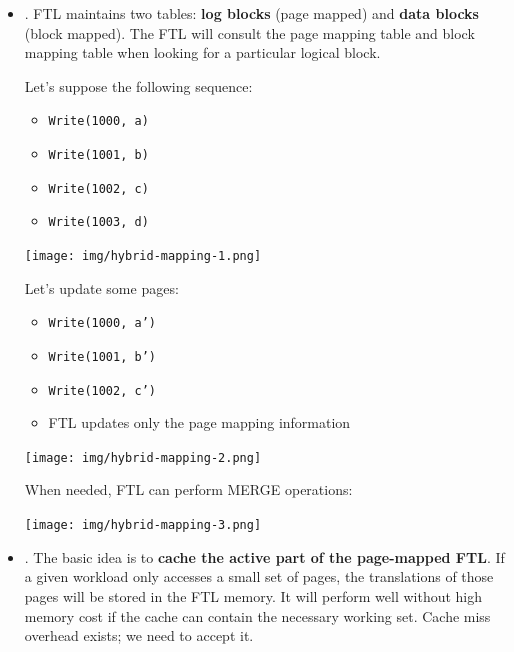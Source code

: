 \begin{itemize}
    \item {}. FTL maintains two tables: \textbf{log blocks} (page mapped) and \textbf{data blocks} (block mapped). The FTL will consult the page mapping table and block mapping table when looking for a particular logical block.
    \begin{examplebox}
        Let's suppose the following sequence:
        \begin{multicols}{2}
            \begin{itemize}
                \item \texttt{Write(1000, a)}
                \item \texttt{Write(1001, b)}
                \item \texttt{Write(1002, c)}
                \item \texttt{Write(1003, d)}
            \end{itemize}
        \end{multicols}
        \begin{center}
            \texttt{[image: img/hybrid-mapping-1.png]}
        \end{center}
        Let's update some pages:
        \begin{itemize}
            \item \texttt{Write(1000, a')}
            \item \texttt{Write(1001, b')}
            \item \texttt{Write(1002, c')}
            \item FTL updates only the page mapping information
        \end{itemize}
        \begin{center}
            \texttt{[image: img/hybrid-mapping-2.png]}
        \end{center}
        When needed, FTL can perform MERGE operations:
        \begin{center}
            \texttt{[image: img/hybrid-mapping-3.png]}
        \end{center}
    \end{examplebox}
    
    \item {}. The basic idea is to \textbf{cache the active part of the page-mapped FTL}. If a given workload only accesses a small set of pages, the translations of those pages will be stored in the FTL memory. It will perform well without high memory cost if the cache can contain the necessary working set. Cache miss overhead exists; we need to accept it.
\end{itemize}


